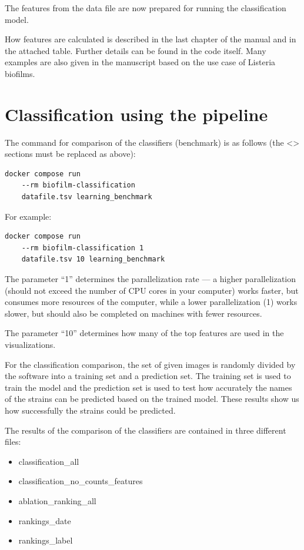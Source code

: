 \documentclass{ol-softwaremanual}
\begin{document}
The features from the data file are now prepared for running the classification model.

How features are calculated is described in the last chapter of the manual and in the attached table. Further details can be found in the code itself. Many examples are also given in the manuscript based on the use case of Listeria biofilms.




\section{Classification using the pipeline}

The command for comparison of the classifiers (benchmark) is as follows (the <> sections must be replaced as above):

\begin{verbatim}
docker compose run 
	--rm biofilm-classification 
	datafile.tsv learning_benchmark	
\end{verbatim}

For example:
\begin{verbatim}
docker compose run 
	--rm biofilm-classification 1 
	datafile.tsv 10 learning_benchmark 
\end{verbatim}

The parameter “1” determines the parallelization rate — a higher parallelization (should not exceed the number of CPU cores in your computer) works faster, but consumes more resources of the computer, while a lower parallelization (1) works slower, but should also be completed on machines with fewer resources.

The parameter “10” determines how many of the top features are used in the visualizations.

For the classification comparison, the set of given images is randomly divided by the software into a training set and a prediction set. The training set is used to train the model and the prediction set is used to test how accurately the names of the strains can be predicted based on the trained model. These results show us how successfully the strains could be predicted.

The results of the comparison of the classifiers are contained in three different files:
\begin{itemize}
	\item classification\_all
	\item classification\_no\_counts\_features
	\item ablation\_ranking\_all
	\item rankings\_date
	\item rankings\_label	
\end{itemize}
\end{document}
